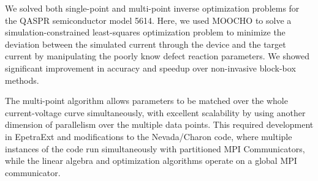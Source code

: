 \documentclass[pdf,ps2pdf,11pt]{SANDreport}
\begin{document}
We solved both single-point and multi-point inverse optimization problems for
the QASPR semiconductor model 5614.  Here, we used MOOCHO to solve a
simulation-constrained least-squares optimization problem to minimize the
deviation between the simulated current through the device and the target
current by manipulating the poorly know defect reaction parameters.  We showed
significant improvement in accuracy and speedup over non-invasive block-box
methods.





The multi-point algorithm allows parameters to be matched over the whole
current-voltage curve simultaneously, with excellent scalability by using
another dimension of parallelism over the multiple data points.  This required
development in EpetraExt and modifications to the Nevada/Charon code, where
multiple instances of the code run simultaneously with partitioned MPI
Communicators, while the linear algebra and optimization algorithms operate on
a global MPI communicator.


\end{document}

